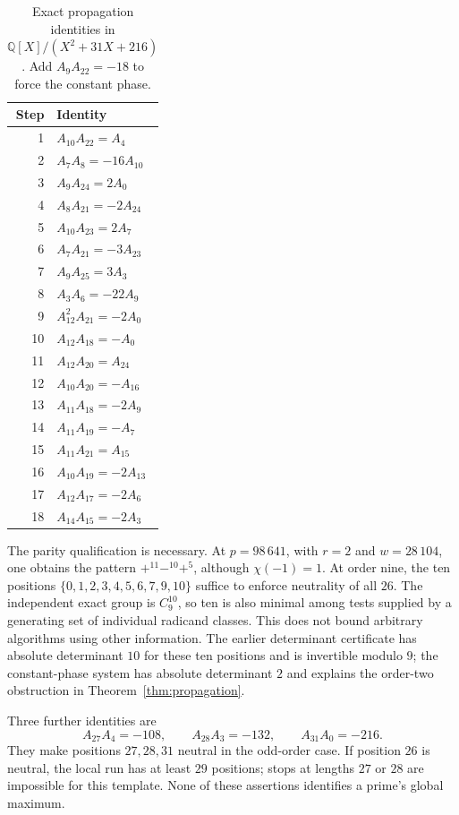 \documentclass[11pt]{article}
\theoremstyle{definition}\newtheorem{definition}[theorem]{Definition}
\newcommand{\Q}{\mathbb Q}
\begin{document}
\begin{table}[htbp]\centering\small\setlength{\tabcolsep}{4pt}
\caption{Exact propagation identities in $\Q[X]/(X^2+31X+216)$. Add $A_9A_{22}=-18$ to force the constant phase.}\label{tab:propagation}
\begin{tabular}{rl}
\toprule
Step & Identity \\
\midrule
1 & $A_{10}A_{22}=A_4$ \\
2 & $A_7A_8=-16A_{10}$ \\
3 & $A_9A_{24}=2A_0$ \\
4 & $A_8A_{21}=-2A_{24}$ \\
5 & $A_{10}A_{23}=2A_7$ \\
6 & $A_7A_{21}=-3A_{23}$ \\
7 & $A_9A_{25}=3A_3$ \\
8 & $A_3A_6=-22A_9$ \\
9 & $A_{12}^2A_{21}=-2A_0$ \\
10 & $A_{12}A_{18}=-A_0$ \\
11 & $A_{12}A_{20}=A_{24}$ \\
12 & $A_{10}A_{20}=-A_{16}$ \\
13 & $A_{11}A_{18}=-2A_9$ \\
14 & $A_{11}A_{19}=-A_7$ \\
15 & $A_{11}A_{21}=A_{15}$ \\
16 & $A_{10}A_{19}=-2A_{13}$ \\
17 & $A_{12}A_{17}=-2A_6$ \\
18 & $A_{14}A_{15}=-2A_3$ \\
\bottomrule\end{tabular}\end{table}

The parity qualification is necessary. At $p=98\,641$, with $r=2$
and $w=28\,104$, one obtains the pattern
$+^{11}-^{10}+^5$, although $\chi(-1)=1$.
At order nine, the ten positions
$\{0,1,2,3,4,5,6,7,9,10\}$ suffice to enforce neutrality of all
$26$. The independent exact group is $C_9^{10}$, so ten is also
minimal among tests supplied by a generating set of individual
radicand classes. This does not bound arbitrary algorithms using
other information. The earlier determinant certificate has absolute
determinant $10$ for these ten positions and is invertible modulo $9$;
the constant-phase system has absolute determinant $2$ and explains
the order-two obstruction in Theorem~\ref{thm:propagation}.

Three further identities are
\[
 A_{27}A_4=-108,\qquad A_{28}A_3=-132,\qquad A_{31}A_0=-216.
\]
They make positions $27,28,31$ neutral in the odd-order case. If
position $26$ is neutral, the local run has at least $29$ positions;
stops at lengths $27$ or $28$ are impossible for this template.
None of these assertions identifies a prime's global maximum.
\end{document}
